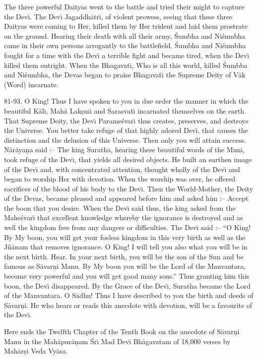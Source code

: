The three powerful Daityas went to the battle and tried their might to capture the Dev\={\i}. The Dev\={\i} Jagaddh\=atr\={\i}, of violent prowess, seeing that these three Daityas were coming to Her, killed them by Her trident and laid them prostrate on the ground. Hearing their death with all their army, \'Sumbha and Ni\'sumbha came in their own persons arrogantly to the battlefield. \'Sumbha and Ni\'sumbha fought for a time with the Dev\={\i} a terrible fight and became tired, when the Dev\={\i} killed them outright. When the Bhagavat\={\i}, Who is all this world, killed \'Sumbba and Ni\'sumbha, the Devas began to praise Bhagavat\={\i} the Supreme Deity of V\=ak (Word) incarnate.

81-93. O King! Thus I have spoken to you in due order the manner in which the beautiful K\=al\={\i}, Mah\=a Lak\d{s}m\={\i} and Sarasvat\={\i} incarnated themselves on the earth. That Supreme Deity, the Dev\={\i} Parame\'svar\={\i} thus creates, preserves, and destroys the Universe. You better take refuge of that highly adored Dev\={\i}, that causes the distinction and the delusion of this Universe. Then only you will attain success. N\=ar\=aya\d{n}a said :-- The king Suratha, hearing these beautiful words of the Muni, took refuge of the Dev\={\i}, that yields all desired objects. He built an earthen image of the Dev\={\i} and, with concentrated attention, thought wholly of the Dev\={\i} and began to worship Her with devotion. When the worship was over, he offered sacrifices of the blood of his body to the Dev\={\i}. Then the World-Mother, the Deity of the Devas, became pleased and appeared before him and asked him :-- Accept the boon that you desire. When the Dev\={\i} said thus, the king asked from the Mahe\'svar\={\i} that excellent knowledge whereby the ignorance is destroyed and as well the kingdom free from any dangers or difficulties. The Dev\={\i} said :-- ``O King! By My boon, you will get your foeless kingdom in this very birth as well as the J\~n\=anam that removes ignorance. O King! I will tell you also what you will be in the next birth. Hear. In your next birth, you will be the son of the Sun and be famous as S\=avar\d{n}i Manu. By My boon you will be the Lord of the Manvantara, become very powerful and you will get good many sons.'' Thus granting him this boon, the Dev\={\i} disappeared. By the Grace of the Dev\={\i}, Suratha became the Lord of the Manvantara. O S\=adhu! Thus I have described to you the birth and deeds of S\=avar\d{n}i. He who hears or reads this anecdote with devotion, will be a favourite of the Dev\={\i}.

Here ends the Twelfth Chapter of the Tenth Book on the anecdote of S\=avar\d{n}i Manu in the Mah\=apur\=a\d{n}am \'Sr\={\i} Mad Dev\={\i} Bh\=agavatam of 18,000 verses by Mah\=ar\d{s}i Veda Vy\=asa.



